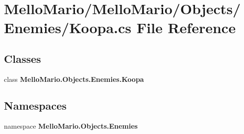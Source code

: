 \section{Mello\+Mario/\+Mello\+Mario/\+Objects/\+Enemies/\+Koopa.cs File Reference}
\label{Koopa_8cs}
\subsection*{Classes}
\begin{DoxyCompactItemize}
\item 
class \textbf{ Mello\+Mario.\+Objects.\+Enemies.\+Koopa}
\end{DoxyCompactItemize}
\subsection*{Namespaces}
\begin{DoxyCompactItemize}
\item 
namespace \textbf{ Mello\+Mario.\+Objects.\+Enemies}
\end{DoxyCompactItemize}
